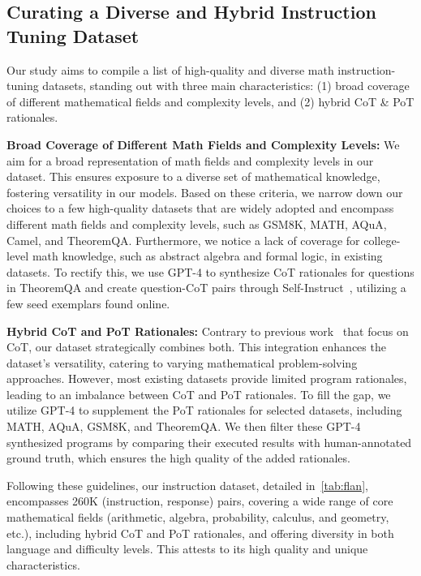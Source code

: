 \subsection{Curating a Diverse and Hybrid Instruction Tuning Dataset} Our study aims to compile a list of high-quality and diverse math instruction-tuning datasets, standing out with three main characteristics: (1) broad coverage of different mathematical fields and complexity levels, and (2) hybrid CoT \& PoT rationales.

\textbf{Broad Coverage of Different Math Fields and Complexity Levels:} We aim for a broad representation of math fields and complexity levels in our dataset. This ensures exposure to a diverse set of mathematical knowledge, fostering versatility in our models. Based on these criteria, we narrow down our choices to a few high-quality datasets that are widely adopted and encompass different math fields and complexity levels, such as GSM8K, MATH, AQuA, Camel, and TheoremQA. Furthermore, we notice a lack of coverage for college-level math knowledge, such as abstract algebra and formal logic, in existing datasets. To rectify this, we use GPT-4 to synthesize CoT rationales for questions in TheoremQA and create question-CoT pairs through Self-Instruct~\citep{wang2022self}, utilizing a few seed exemplars found online.

\textbf{Hybrid CoT and PoT Rationales:} Contrary to previous work~\citep{yuan2023scaling,luo2023wizardmath,lee2023platypus,wang2023far} that focus on CoT, our dataset strategically combines both. This integration enhances the dataset's versatility, catering to varying mathematical problem-solving approaches. However, most existing datasets provide limited program rationales, leading to an imbalance between CoT and PoT rationales. To fill the gap, we utilize GPT-4 to supplement the PoT rationales for selected datasets, including MATH, AQuA, GSM8K, and TheoremQA. We then filter these GPT-4 synthesized programs by comparing their executed results with human-annotated ground truth, which ensures the high quality of the added rationales.

Following these guidelines, our instruction dataset, detailed in~\autoref{tab:flan}, encompasses 260K (instruction, response) pairs, covering a wide range of core mathematical fields (arithmetic, algebra, probability, calculus, and geometry, etc.),  including hybrid CoT and PoT rationales, and offering diversity in both language and difficulty levels. This attests to its high quality and unique characteristics.

